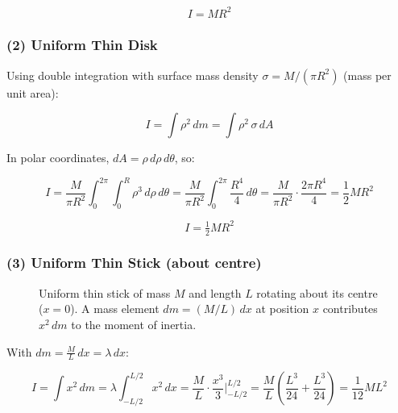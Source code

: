 \[
    \boxed{I = MR^2}
\]

\subsubsection{(2) Uniform Thin Disk}

Using double integration with surface mass density $\sigma = M/(\pi R^2)$ (mass per unit area):

\[
    I = \int \rho^2\,dm = \int \rho^2\,\sigma\,dA
\]

In polar coordinates, $dA = \rho\,d\rho\,d\theta$, so:

\[
    I = \frac{M}{\pi R^2}\int_0^{2\pi}\int_0^{R} \rho^3\,d\rho\,d\theta
    = \frac{M}{\pi R^2}\int_0^{2\pi}\frac{R^4}{4}\,d\theta
    = \frac{M}{\pi R^2}\cdot\frac{2\pi R^4}{4} = \frac{1}{2}MR^2
\]

\[
    \boxed{I = \tfrac{1}{2}MR^2}
\]

\subsubsection{(3) Uniform Thin Stick (about centre)}

\begin{figure}[H]
\begin{center}
\end{center}
\caption{Uniform thin stick of mass $M$ and length $L$ rotating about its centre ($x=0$). A mass element $dm = (M/L)\,dx$ at position $x$ contributes $x^2\,dm$ to the moment of inertia.}
\label{fig:moi_stick}
\end{figure}

With $dm = \frac{M}{L}\,dx = \lambda\,dx$:

\[
    I = \int x^2\,dm = \lambda\int_{-L/2}^{L/2} x^2\,dx
    = \frac{M}{L}\cdot\frac{x^3}{3}\Bigg|_{-L/2}^{L/2}
    = \frac{M}{L}\!\left(\frac{L^3}{24}+\frac{L^3}{24}\right)
    = \frac{1}{12}ML^2
\]

